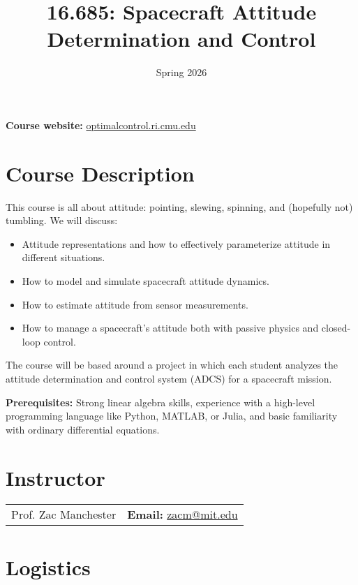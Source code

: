 \documentclass[11pt,letterpaper]{article}
\title{16.685: Spacecraft Attitude Determination and Control}
\author{Spring 2026}
\date{}
\begin{document}
\maketitle

\noindent 
\textbf{Course website:} \href{https://optimalcontrol.ri.cmu.edu/}{optimalcontrol.ri.cmu.edu}

\section*{Course Description}

This course is all about attitude: pointing, slewing, spinning, and (hopefully not) tumbling. We will discuss:
\begin{itemize}
\item Attitude representations and how to effectively parameterize attitude in different situations.
\item How to model and simulate spacecraft attitude dynamics.
\item How to estimate attitude from sensor measurements.
\item How to manage a spacecraft's attitude both with passive physics and closed-loop control.
\end{itemize}
The course will be based around a project in which each student analyzes the attitude determination and control system (ADCS) for a spacecraft mission.

\medskip
\noindent
\textbf{Prerequisites:} Strong linear algebra skills, experience with a high-level programming language like Python, MATLAB, or Julia, and basic familiarity with ordinary differential equations.

\section*{Instructor}

\begin{center}
\begin{tabular}{l l}
	Prof. Zac Manchester & \textbf{Email:} \href{mailto:zacm@mit.edu}{zacm@mit.edu}
\end{tabular}
\end{center}

\section*{Logistics}
\end{document}
